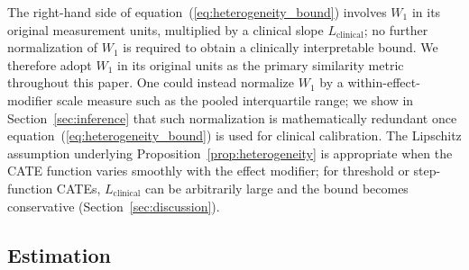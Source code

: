 The right-hand side of equation~(\ref{eq:heterogeneity_bound}) involves $W_1$ in its original measurement units, multiplied by a clinical slope $L_{\text{clinical}}$; no further normalization of $W_1$ is required to obtain a clinically interpretable bound. We therefore adopt $W_1$ in its original units as the primary similarity metric throughout this paper. One could instead normalize $W_1$ by a within-effect-modifier scale measure such as the pooled interquartile range; we show in Section~\ref{sec:inference} that such normalization is mathematically redundant once equation~(\ref{eq:heterogeneity_bound}) is used for clinical calibration. The Lipschitz assumption underlying Proposition~\ref{prop:heterogeneity} is appropriate when the CATE function varies smoothly with the effect modifier; for threshold or step-function CATEs, $L_{\text{clinical}}$ can be arbitrarily large and the bound becomes conservative (Section~\ref{sec:discussion}).

\subsection{Estimation}\label{sec:estimation}

